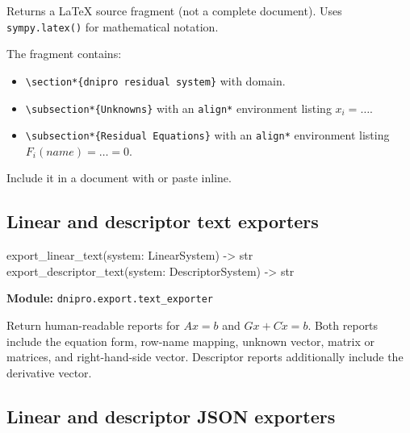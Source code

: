 \documentclass[11pt,a4paper]{article}
\newcommand{\code}[1]{\texttt{#1}}
\newenvironment{apisig}{%
  \begin{trivlist}\item\relax\ttfamily\small
}{%
  \end{trivlist}
}
\begin{document}
Returns a \LaTeX{} source fragment (not a complete document).
Uses \code{sympy.latex()} for mathematical notation.

The fragment contains:
\begin{itemize}[noitemsep]
    \item \verb|\section*{dnipro residual system}| with domain.
    \item \verb|\subsection*{Unknowns}| with an \code{align*} environment
          listing \(x_i = \ldots\).
    \item \verb|\subsection*{Residual Equations}| with an \code{align*} environment
          listing \(F_i(\textit{name}) = \ldots = 0\).
\end{itemize}

Include it in a document with \verb|| or paste inline.

\subsection{Linear and descriptor text exporters}
\label{api:linear_descriptor_text_exporters}

\begin{apisig}
export\_linear\_text(system: LinearSystem) -> str \\
export\_descriptor\_text(system: DescriptorSystem) -> str
\end{apisig}

\textbf{Module:} \code{dnipro.export.text\_exporter}

Return human-readable reports for \(A x = b\) and \(Gx + C\dot{x} = b\).
Both reports include the equation form, row-name mapping, unknown vector, matrix
or matrices, and right-hand-side vector. Descriptor reports additionally include
the derivative vector.

\subsection{Linear and descriptor JSON exporters}
\label{api:linear_descriptor_json_exporters}
\end{document}

